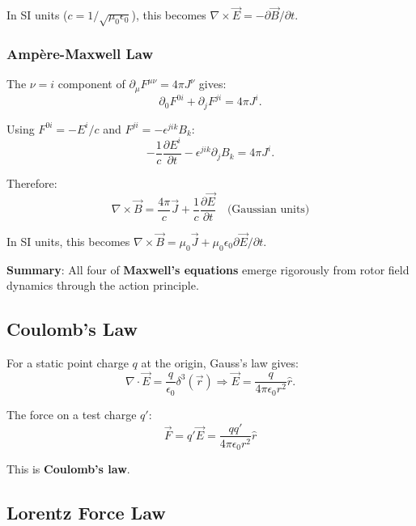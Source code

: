\documentclass[12pt,a4paper]{article}
\theoremstyle{definition}
\theoremstyle{remark}
\begin{document}
In SI units ($c = 1/\sqrt{\mu_0\epsilon_0}$), this becomes $\nabla \times \vec{E} = -\partial \vec{B}/\partial t$.

\subsubsection{Ampère-Maxwell Law}

The $\nu = i$ component of $\partial_\mu F^{\mu\nu} = 4\pi J^\nu$ gives:
\begin{equation}
\partial_0 F^{0i} + \partial_j F^{ji} = 4\pi J^i.
\end{equation}

Using $F^{0i} = -E^i/c$ and $F^{ji} = -\epsilon^{jik} B_k$:
\begin{equation}
-\frac{1}{c}\frac{\partial E^i}{\partial t} - \epsilon^{jik}\partial_j B_k = 4\pi J^i.
\end{equation}

Therefore:
\begin{equation}
\boxed{\nabla \times \vec{B} = \frac{4\pi}{c} \vec{J} + \frac{1}{c}\frac{\partial \vec{E}}{\partial t}} \quad \text{(Gaussian units)}
\end{equation}

In SI units, this becomes $\nabla \times \vec{B} = \mu_0 \vec{J} + \mu_0\epsilon_0 \partial \vec{E}/\partial t$.

\textbf{Summary}: All four of \textbf{Maxwell's equations} emerge rigorously from rotor field dynamics through the action principle.

\subsection{Coulomb's Law}

For a static point charge $q$ at the origin, Gauss's law gives:
\begin{equation}
\nabla \cdot \vec{E} = \frac{q}{\epsilon_0} \delta^3(\vec{r}) \Rightarrow \vec{E} = \frac{q}{4\pi\epsilon_0 r^2} \hat{r}.
\end{equation}

The force on a test charge $q'$:
\begin{equation}
\boxed{\vec{F} = q'\vec{E} = \frac{qq'}{4\pi\epsilon_0 r^2} \hat{r}}
\end{equation}

This is \textbf{Coulomb's law}.

\subsection{Lorentz Force Law}
\end{document}
